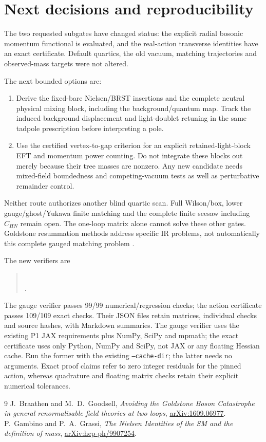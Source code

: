 \documentclass[11pt]{article}
\begin{document}
\section{Next decisions and reproducibility}
The two requested subgates have changed status: the explicit radial
bosonic momentum functional is evaluated, and the real-action transverse
identities have an exact certificate. Default quartics, the old vacuum,
matching trajectories and observed-mass targets were not altered.

The next bounded options are:
\begin{enumerate}
 \item Derive the fixed-bare Nielsen/BRST insertions and the complete
 neutral physical mixing block, including the background/quantum map.
 Track the induced background displacement and light-doublet retuning
 in the same tadpole prescription before interpreting a pole.
 \item Use the certified vertex-to-gap criterion for an explicit
 retained-light-block EFT and momentum power counting. Do not integrate
 these blocks out merely because their tree masses are nonzero.
 Any new candidate needs mixed-field boundedness and competing-vacuum
 tests as well as perturbative remainder control.
\end{enumerate}
Neither route authorizes another blind quartic scan. Full Wilson/box,
lower gauge/ghost/Yukawa finite matching and the complete finite seesaw
including $C_{HN}$ remain open. The one-loop matrix alone cannot solve
these other gates. Goldstone resummation methods address specific IR
problems, not automatically this complete gauged matching problem
\cite{BraathenGoodsell}.

The new verifiers are
\begin{quote}\small
{}\\
.
\end{quote}
The gauge verifier passes 99/99 numerical/regression checks; the action
certificate passes 109/109 exact checks. Their JSON files retain
matrices, individual checks and source hashes, with Markdown summaries.
The gauge verifier uses the existing P1 JAX requirements plus NumPy,
SciPy and mpmath; the exact certificate uses only Python, NumPy and SciPy,
not JAX or any floating Hessian cache. Run the former with the existing
\texttt{--cache-dir}; the latter needs no arguments. Exact proof claims
refer to zero integer residuals for the pinned action, whereas quadrature
and floating matrix checks retain their explicit numerical tolerances.

\begin{thebibliography}{9}
J.~Braathen and M.~D.~Goodsell,
\emph{Avoiding the Goldstone Boson Catastrophe in general renormalisable
field theories at two loops},
\href{https://arxiv.org/abs/1609.06977}{arXiv:1609.06977}.
P.~Gambino and P.~A.~Grassi,
\emph{The Nielsen Identities of the SM and the definition of mass},
\href{https://arxiv.org/abs/hep-ph/9907254}{arXiv:hep-ph/9907254}.
\end{thebibliography}
\end{document}

